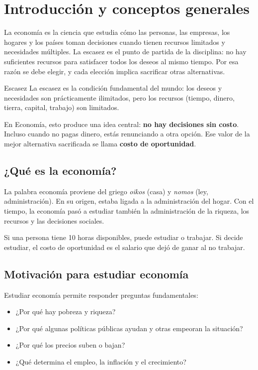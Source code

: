 \section{Introducción y conceptos generales}
\label{sec:introduccion-conceptos}

La economía es la ciencia que estudia cómo las personas, las empresas, los hogares y los países toman decisiones cuando tienen recursos limitados y necesidades múltiples. La escasez es el punto de partida de la disciplina: no hay suficientes recursos para satisfacer todos los deseos al mismo tiempo. Por esa razón se debe elegir, y cada elección implica sacrificar otras alternativas.

\begin{concepto}{Escasez}
La escasez es la condición fundamental del mundo: los deseos y necesidades son prácticamente ilimitados, pero los recursos (tiempo, dinero, tierra, capital, trabajo) son limitados.
\end{concepto}

En Economía, esto produce una idea central: \textbf{no hay decisiones sin costo}. Incluso cuando no pagas dinero, estás renunciando a otra opción. Ese valor de la mejor alternativa sacrificada se llama \textbf{costo de oportunidad}.

\subsection{¿Qué es la economía?}

La palabra economía proviene del griego \textit{oikos} (casa) y \textit{nomos} (ley, administración). En su origen, estaba ligada a la administración del hogar. Con el tiempo, la economía pasó a estudiar también la administración de la riqueza, los recursos y las decisiones sociales.

\begin{ejemplo}
Si una persona tiene 10 horas disponibles, puede estudiar o trabajar. Si decide estudiar, el costo de oportunidad es el salario que dejó de ganar al no trabajar.
\end{ejemplo}

\subsection{Motivación para estudiar economía}

Estudiar economía permite responder preguntas fundamentales:
\begin{itemize}
    \item ¿Por qué hay pobreza y riqueza?
    \item ¿Por qué algunas políticas públicas ayudan y otras empeoran la situación?
    \item ¿Por qué los precios suben o bajan?
    \item ¿Qué determina el empleo, la inflación y el crecimiento?
\end{itemize}

